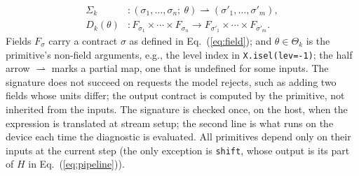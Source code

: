 \documentclass[gmd, manuscript]{copernicus}
\begin{document}
\begin{equation}
\begin{aligned}
  \Sigma_k &: (\sigma_1,\ldots,\sigma_n;\ \theta)
        \rightharpoonup (\sigma'_1,\ldots,\sigma'_m),\\
  D_k(\theta) &: F_{\sigma_1}\times\cdots\times F_{\sigma_n}
        \longrightarrow F_{\sigma'_1}\times\cdots\times F_{\sigma'_m}.
\end{aligned}
\label{eq:ops}
\end{equation}
Fields $F_\sigma$ carry a contract $\sigma$ as defined in Eq.~(\ref{eq:field}); and $\theta\in\Theta_k$ is the primitive's non-field arguments, e.g., the level index in \texttt{X.isel(lev=-1)}; the half arrow $\rightharpoonup$ marks a partial map, one that is undefined for some inputs. The signature does not succeed on requests the model rejects, such as adding two fields whose units differ; the output contract is computed by the primitive, not inherited from the inputs. The signature is checked once, on the host, when the expression is translated at stream setup; the second line is what runs on the device each time the diagnostic is evaluated. All primitives depend only on their inputs at the current step (the only exception is \texttt{shift}, whose output is its part of $H$ in Eq.~(\ref{eq:pipeline})).
\end{document}
